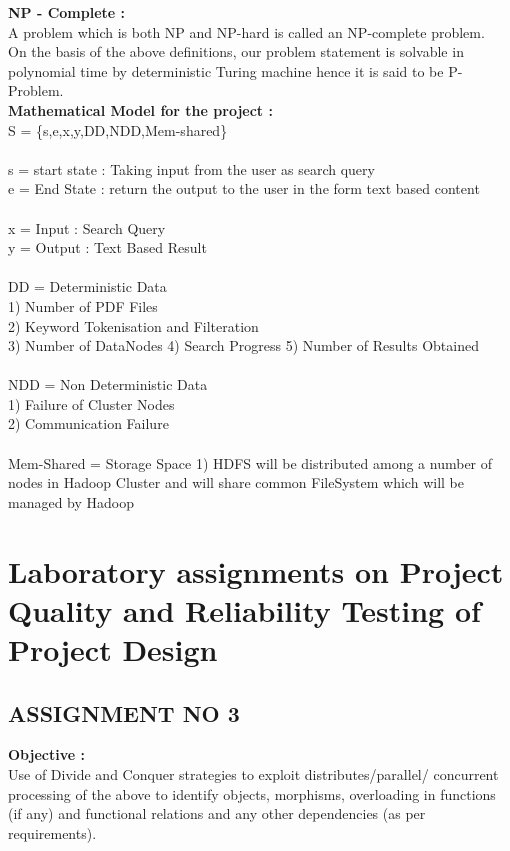 \documentclass[oneside,a4paper,12pt]{report}
\begin{document}
{\begin{appendices}
\textbf{NP - Complete :} \\
A problem which is both NP and NP-hard is called an NP-complete problem. 
\\

On the basis of the above definitions, our problem statement is solvable in polynomial time by deterministic Turing machine hence it   is said to be P-Problem. \\

\noindent \textbf{Mathematical Model for the project :} \\
S = \{s,e,x,y,DD,NDD,Mem-shared\} \\\\
s = start state : Taking input from the user as search query \\
e = End State : return the output to the user in the form text based content \\\\
x = Input : Search Query \\
y = Output : Text Based Result \\\\
DD = Deterministic Data \\
1) Number of PDF Files \\
2) Keyword Tokenisation and Filteration \\
3) Number of DataNodes 
4) Search Progress 
5) Number of Results Obtained \\\\
NDD = Non Deterministic Data \\
1) Failure of Cluster Nodes \\
2) Communication Failure  \\\\
Mem-Shared = Storage Space 
1) HDFS will be distributed among a number of nodes in Hadoop Cluster and will share common FileSystem which will be managed by Hadoop \\


\chapter{Laboratory assignments on Project Quality and Reliability Testing of Project Design}

\section{ASSIGNMENT NO 3}

\textbf{Objective :} \\
Use of Divide and Conquer strategies to exploit distributes/parallel/ concurrent processing of the above to identify objects, morphisms, overloading in functions (if any) and functional relations and any other dependencies (as per requirements). \\


\end{appendices}}
\end{document}

